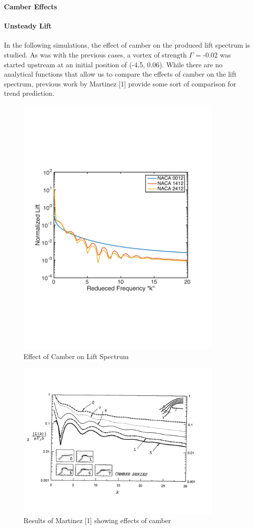 \documentclass{article}
\begin{document}
\noindent \textbf{Camber Effects} \\ \\
\noindent \textbf{Unsteady Lift}\\ \\
In the following simulations, the effect of camber on the produced lift spectrum is studied. As was with the previous cases, a vortex of strength $\Gamma$ = -0.02 was started upstream at an initial position of (-4.5, 0.06). While there are no analytical functions that allow us to compare the effects of camber on the lift spectrum, previous work by Martinez [1] provide some sort of comparison for trend prediction. 

\begin{figure}[h]
\includegraphics[width = 4in, height = 3 in]{Camber_Compare}
\centering
\caption{Effect of Camber on Lift Spectrum}
\end{figure}

\begin{figure}[h]
\includegraphics[width = 4in, height = 2.5 in]{Martinez_Camber}
\centering
\caption{Results of Martinez [1] showing effects of camber}
\end{figure}
\end{document}
